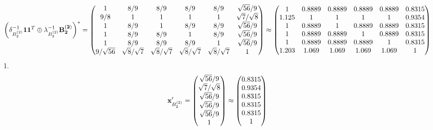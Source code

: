 \documentclass[10pt,a4paper]{article}
\begin{document}
	\[
		\left(\delta_{B_2^{(2)}}^{-1}\bold{11}^T \oplus \lambda_{B_2^{(2)}}^{-1}\bold{B_2^{(2)}}\right)^* = 
		\begin{pmatrix}
			{1}{} & {{8}} / {{9}} & {{8}} / {{9}} & {{8}} / {{9}} & {{8}} / {{9}} & {\sqrt{56}} / {{9}} \\
			{{9}} / {{8}} & {1}{} & {1}{} & {1}{} & {1}{} & {\sqrt{7}} / {\sqrt{8}} \\
			{1}{} & {{8}} / {{9}} & {1}{} & {{8}} / {{9}} & {{8}} / {{9}} & {\sqrt{56}} / {{9}} \\
			{1}{} & {{8}} / {{9}} & {{8}} / {{9}} & {1}{} & {{8}} / {{9}} & {\sqrt{56}} / {{9}} \\
			{1}{} & {{8}} / {{9}} & {{8}} / {{9}} & {{8}} / {{9}} & {1}{} & {\sqrt{56}} / {{9}} \\
			{{9}} / {\sqrt{56}} & {\sqrt{8}} / {\sqrt{7}} & {\sqrt{8}} / {\sqrt{7}} & {\sqrt{8}} / {\sqrt{7}} & {\sqrt{8}} / {\sqrt{7}} & {1}{} \\
		\end{pmatrix}
		\approx
		\begin{pmatrix}
			1        & 0.8889   & 0.8889   & 0.8889   & 0.8889   & 0.8315   \\
			1.125    & 1        & 1        & 1        & 1        & 0.9354   \\
			1        & 0.8889   & 1        & 0.8889   & 0.8889   & 0.8315   \\
			1        & 0.8889   & 0.8889   & 1        & 0.8889   & 0.8315   \\
			1        & 0.8889   & 0.8889   & 0.8889   & 1        & 0.8315   \\
			1.203    & 1.069    & 1.069    & 1.069    & 1.069    & 1        \\
		\end{pmatrix}
	\]
	1.
	\[
		\bold{x}'_{B_2^{(2)}} = 
		\begin{pmatrix}
			{\sqrt{56}} / {{9}} \\
			{\sqrt{7}} / {\sqrt{8}} \\
			{\sqrt{56}} / {{9}} \\
			{\sqrt{56}} / {{9}} \\
			{\sqrt{56}} / {{9}} \\
			{1}{} \\
		\end{pmatrix}
		\approx
		\begin{pmatrix}
			0.8315   \\
			0.9354   \\
			0.8315   \\
			0.8315   \\
			0.8315   \\
			1        \\
		\end{pmatrix}
	\]
\end{document}
